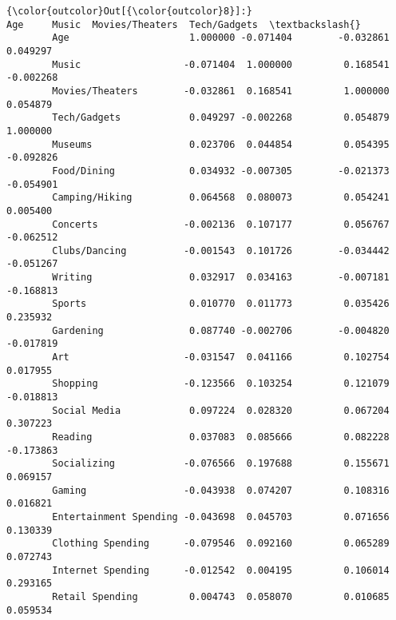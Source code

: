 \documentclass[11pt]{article}
\begin{document}
\begin{Verbatim}[commandchars=\\\{\}]
{\color{outcolor}Out[{\color{outcolor}8}]:}                              Age     Music  Movies/Theaters  Tech/Gadgets  \textbackslash{}
        Age                     1.000000 -0.071404        -0.032861      0.049297   
        Music                  -0.071404  1.000000         0.168541     -0.002268   
        Movies/Theaters        -0.032861  0.168541         1.000000      0.054879   
        Tech/Gadgets            0.049297 -0.002268         0.054879      1.000000   
        Museums                 0.023706  0.044854         0.054395     -0.092826   
        Food/Dining             0.034932 -0.007305        -0.021373     -0.054901   
        Camping/Hiking          0.064568  0.080073         0.054241      0.005400   
        Concerts               -0.002136  0.107177         0.056767     -0.062512   
        Clubs/Dancing          -0.001543  0.101726        -0.034442     -0.051267   
        Writing                 0.032917  0.034163        -0.007181     -0.168813   
        Sports                  0.010770  0.011773         0.035426      0.235932   
        Gardening               0.087740 -0.002706        -0.004820     -0.017819   
        Art                    -0.031547  0.041166         0.102754      0.017955   
        Shopping               -0.123566  0.103254         0.121079     -0.018813   
        Social Media            0.097224  0.028320         0.067204      0.307223   
        Reading                 0.037083  0.085666         0.082228     -0.173863   
        Socializing            -0.076566  0.197688         0.155671      0.069157   
        Gaming                 -0.043938  0.074207         0.108316      0.016821   
        Entertainment Spending -0.043698  0.045703         0.071656      0.130339   
        Clothing Spending      -0.079546  0.092160         0.065289      0.072743   
        Internet Spending      -0.012542  0.004195         0.106014      0.293165   
        Retail Spending         0.004743  0.058070         0.010685      0.059534   
        

\end{Verbatim}
\end{document}
